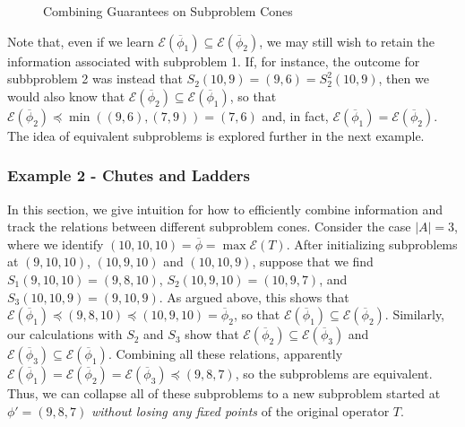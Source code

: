 \documentclass[11pt,reqno]{amsart}
\theoremstyle{definition}
\numberwithin{equation}{section}
\newcommand{\ol}{\overline}
\newcommand{\pre}{\phi}
\newcommand{\sub}{\subseteq}
\newcommand{\fix}{\mathcal{E}}
\newcommand{\peq}{\preceq}
\newcommand{\toppre}{\ol{\pre}}
\begin{document}
\begin{figure} \label{fig:rectangles}
\caption{Combining Guarantees on Subproblem Cones}
\end{figure}

Note that, even if we learn $\fix(\toppre_1) \sub \fix(\toppre_2)$, we may still wish to retain the information associated with subproblem 1. 
If, for instance, the outcome for subbproblem 2 was instead that $S_2(10,9) =  (9,6) = S_2^2(10,9)$, then we would also know that $\fix(\toppre_2) \sub \fix(\toppre_1)$, so that $\fix(\toppre_2) \peq \min((9,6),(7,9)) = (7,6)$ and, in fact, $\fix(\toppre_1) = \fix(\toppre_2)$.
The idea of equivalent subproblems is explored further in the next example. 

\subsubsection{Example 2 - Chutes and Ladders}
In this section, we give intuition for how to efficiently combine information and track the relations between different subproblem cones. 
Consider the case $|A| = 3$, where we identify $(10,10,10) = \toppre = \max \fix(T)$. 
After initializing subproblems at $(9,10,10)$, $(10,9,10)$ and $(10,10,9)$, suppose that we find $S_1(9,10,10) = (9,8,10)$, $S_2(10,9,10) = (10,9,7)$, and $S_3(10,10,9) = (9,10,9)$. 
As argued above, this shows that $\fix(\toppre_1) \peq (9,8,10) \peq (10,9,10) = \toppre_2$, so that $\fix(\toppre_1) \sub \fix(\toppre_2)$. 
Similarly, our calculations with $S_2$ and $S_3$ show that $\fix(\toppre_2) \sub \fix(\toppre_3)$ and $\fix(\toppre_3) \sub \fix(\toppre_1)$. 
Combining all these relations, apparently $\fix(\toppre_1) = \fix(\toppre_2) = \fix(\toppre_3) \peq (9,8,7)$, so the subproblems are equivalent.  
Thus, we can collapse all of these subproblems to a new subproblem started at $\pre' = (9,8,7)$ \emph{without losing any fixed points} of the original operator $T$. 
\end{document}
